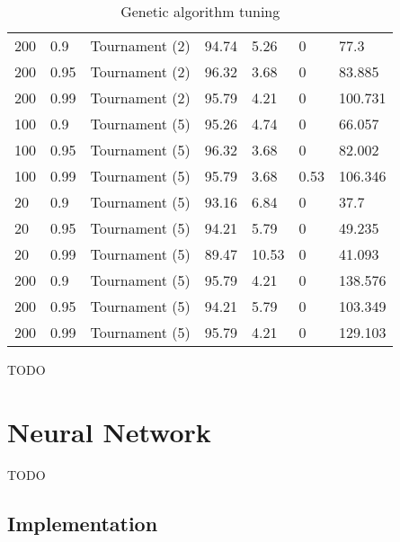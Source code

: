 \documentclass[a4paper]{article}
\begin{document}
\begin{table}[h!]
\begin{tabular}{@{}lllllll@{}}
    200             & 0.9        & Tournament (2) & 94.74         & 5.26       & 0                 & 77.3     \\
    200             & 0.95       & Tournament (2) & 96.32         & 3.68       & 0                 & 83.885   \\
    200             & 0.99       & Tournament (2) & 95.79         & 4.21       & 0                 & 100.731  \\
    100             & 0.9        & Tournament (5) & 95.26         & 4.74       & 0                 & 66.057   \\
    100             & 0.95       & Tournament (5) & 96.32         & 3.68       & 0                 & 82.002   \\
    100             & 0.99       & Tournament (5) & 95.79         & 3.68       & 0.53              & 106.346  \\
    20              & 0.9        & Tournament (5) & 93.16         & 6.84       & 0                 & 37.7     \\
    20              & 0.95       & Tournament (5) & 94.21         & 5.79       & 0                 & 49.235   \\
    20              & 0.99       & Tournament (5) & 89.47         & 10.53      & 0                 & 41.093   \\
    200             & 0.9        & Tournament (5) & 95.79         & 4.21       & 0                 & 138.576  \\
    200             & 0.95       & Tournament (5) & 94.21         & 5.79       & 0                 & 103.349  \\
    200             & 0.99       & Tournament (5) & 95.79         & 4.21       & 0                 & 129.103  \\
    \bottomrule
  \end{tabular}
  \caption{Genetic algorithm tuning}
  \label{tab:ga_tuning}
\end{table}

TODO

\section{Neural Network}
\label{sec:nn}

TODO

\subsection{Implementation}
\label{sec:nn_implementation}
\end{document}
